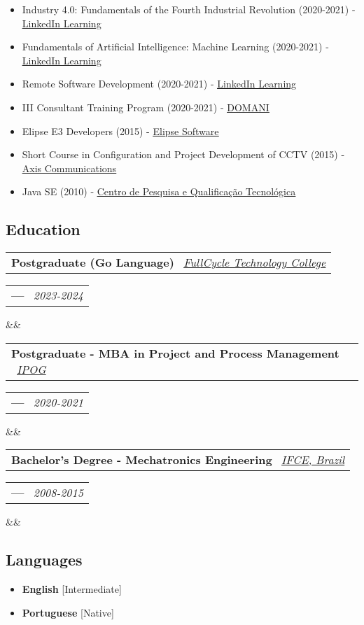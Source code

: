 \documentclass[11pt,a4paper,sans]{moderncv}
\makeatletter
\newcommand*{\customcventry}[7][.13em]{
\begin{tabular}{@{}l}
{\bfseries #4} \
{\itshape #3}
\end{tabular}
\hfill
\begin{tabular}{l@{}}
{\bfseries #5} \
{\itshape #2}
\end{tabular}
\ifx&#7&%
\else{\
\begin{minipage}{\maincolumnwidth}%
\small#7%
\end{minipage}}\fi%
\par\addvspace{#1}}
\makeatother
\begin{document}
\begin{samepage}
{\begin{itemize}[label=\textbullet]
		  \item Industry 4.0: Fundamentals of the Fourth Industrial Revolution (2020-2021) - \underline{\color{blue}\href{https://linkedin.com/learning}{LinkedIn Learning}}
		  \item Fundamentals of Artificial Intelligence: Machine Learning (2020-2021) - \underline{\color{blue}\href{https://linkedin.com/learning}{LinkedIn Learning}}
		  \item Remote Software Development (2020-2021) - \underline{\color{blue}\href{https://linkedin.com/learning}{LinkedIn Learning}}
		  \item III Consultant Training Program (2020-2021) - \underline{\color{blue}\href{https://domani.com.br}{DOMANI}}
		  \item Elipse E3 Developers (2015) - \underline{\color{blue}\href{https://elipse.com}{Elipse Software}}
		  \item Short Course in Configuration and Project Development of CCTV (2015) - \underline{\color{blue}\href{https://axis.com}{Axis Communications}}
		  \item Java SE (2010) - \underline{\color{blue}\href{https://cpqt.com.br}{Centro de Pesquisa e Qualificação Tecnológica}}
	  \end{itemize}}
\end{samepage}
\vspace{\baselineskip}

\begin{samepage}
	\section{Education}
	\customcventry{2023-2024}{{\color{blue}\href{https://fctech.edu.br}{FullCycle Technology College}}}{Postgraduate (Go Language)}{---}{}{}
	\customcventry{2020-2021}{{\color{blue}\href{https://www.ipog.edu.br}{IPOG}}}{Postgraduate - MBA in Project and Process Management}{---}{}{}
	\customcventry{2008-2015}{{\color{blue}\href{https://ifce.edu.br}{IFCE, Brazil}}}{Bachelor's Degree - Mechatronics Engineering}{---}{}{}
\end{samepage}
\vspace{\baselineskip}

\begin{samepage}
	\section{Languages}
	\begin{multicols}{2}
		\begin{itemize}[label=\textbullet]
			\item \textbf{English} [Intermediate]
			\item \textbf{Portuguese} [Native]
		\end{itemize}
	\end{multicols}
\end{samepage}
\vspace{\baselineskip}
\end{document}
